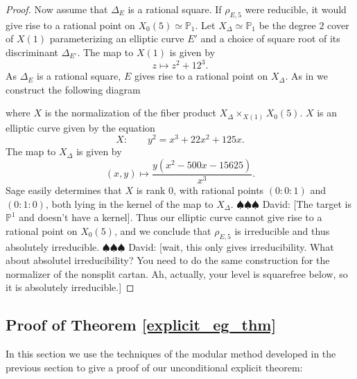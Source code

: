\documentclass[12pt]{amsart}
\theoremstyle{definition}
\def\P{{{\mathbb P}}}
\newcommand{\david}[1]{{\color{blue} \sf $\spadesuit\spadesuit\spadesuit$ David: [#1]}}
\begin{document}
\begin{proof}
Now assume that $\Delta_E$ is a rational square.  If $\rho_{E,5}$ were reducible, it would give rise to a rational point on $X_0(5) \simeq \P_1$.  Let $X_{\Delta} \simeq \P_1$ be the degree $2$ cover of $X(1)$ parameterizing an elliptic curve $E'$ and a choice of square root of its discriminant $\Delta_{E'}$.  The map to $X(1)$ is given by
\[z \mapsto z^2 + 12^3. \]
As $\Delta_E$ is a rational square, $E$ gives rise to a rational point on $X_{\Delta}$.
As in \cite{brown12} we construct the following diagram
\begin{center}
\end{center}
where $X$ is the normalization of the fiber product $X_{\Delta} \times_{X(1)} X_0(5)$.  $X$ is an elliptic curve given by the equation
\[X: \qquad  y^2 = x^3 + 22x^2 +125x .\]
The map to $X_{\Delta}$ is given by
\[ (x,y) \mapsto \frac{y(x^2-500x -15625)}{x^3}. \]
Sage easily determines that $X$ is rank $0$, with rational points $(0:0:1)$ and $(0:1:0)$, both lying in the kernel of the map to $X_{\Delta}$.  \david{The target is $\P^1$ and doesn't have a kernel}. Thus our elliptic curve cannot give rise to a rational point on $X_0(5)$, and we conclude that $\rho_{E,5}$ is irreducible and thus absolutely irreducible.  \david{wait, this only gives irreducibility. What about absolutel irreducibility? You need to do the same construction for the normalizer of the nonsplit cartan. Ah, actually, your level is squarefree below, so it is absolutely irreducible.}
\end{proof}

\subsection{Proof of Theorem \ref{explicit_eg_thm}}

In this section we use the techniques of the modular method developed in the previous section to give a proof of our unconditional explicit theorem:
\end{document}
